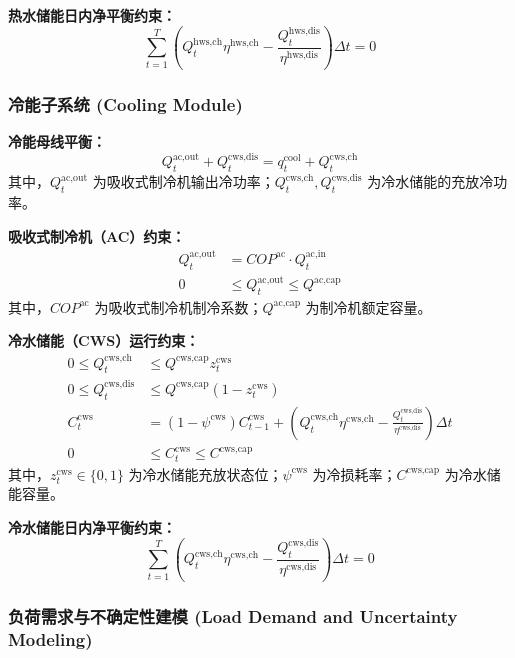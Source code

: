 \documentclass[11pt]{ctexart}
\begin{document}
\textbf{热水储能日内净平衡约束：}
\begin{equation}
\sum_{t=1}^{T} \left( Q_{t}^{\text{hws,ch}} \eta^{\text{hws,ch}} - \frac{Q_{t}^{\text{hws,dis}}}{\eta^{\text{hws,dis}}} \right) \Delta t = 0
\end{equation}

\subsubsection{冷能子系统 (Cooling Module)}

\textbf{冷能母线平衡：}
\begin{equation}
Q_{t}^{\text{ac,out}} + Q_{t}^{\text{cws,dis}} = q_{t}^{\text{cool}} + Q_{t}^{\text{cws,ch}}
\end{equation}
其中，$Q_{t}^{\text{ac,out}}$ 为吸收式制冷机输出冷功率；$Q_{t}^{\text{cws,ch}}, Q_{t}^{\text{cws,dis}}$ 为冷水储能的充放冷功率。

\textbf{吸收式制冷机（AC）约束：}
\begin{align}
Q_{t}^{\text{ac,out}} & = COP^{\text{ac}} \cdot Q_{t}^{\text{ac,in}} \\
0 & \le Q_{t}^{\text{ac,out}} \le Q^{\text{ac,cap}}
\end{align}
其中，$COP^{\text{ac}}$ 为吸收式制冷机制冷系数；$Q^{\text{ac,cap}}$ 为制冷机额定容量。

\textbf{冷水储能（CWS）运行约束：}
\begin{align}
0 \le Q_{t}^{\text{cws,ch}} & \le Q^{\text{cws,cap}} z_{t}^{\text{cws}} \\
0 \le Q_{t}^{\text{cws,dis}} & \le Q^{\text{cws,cap}} (1 - z_{t}^{\text{cws}}) \\
C_{t}^{\text{cws}} & = (1 - \psi^{\text{cws}}) C_{t-1}^{\text{cws}} + \left( Q_{t}^{\text{cws,ch}} \eta^{\text{cws,ch}} - \frac{Q_{t}^{\text{cws,dis}}}{\eta^{\text{cws,dis}}} \right) \Delta t \\
0 & \le C_{t}^{\text{cws}} \le C^{\text{cws,cap}}
\end{align}
其中，$z_{t}^{\text{cws}} \in \{0, 1\}$ 为冷水储能充放状态位；$\psi^{\text{cws}}$ 为冷损耗率；$C^{\text{cws,cap}}$ 为冷水储能容量。

\textbf{冷水储能日内净平衡约束：}
\begin{equation}
\sum_{t=1}^{T} \left( Q_{t}^{\text{cws,ch}} \eta^{\text{cws,ch}} - \frac{Q_{t}^{\text{cws,dis}}}{\eta^{\text{cws,dis}}} \right) \Delta t = 0
\end{equation}

\subsubsection{负荷需求与不确定性建模 (Load Demand and Uncertainty Modeling)}
\end{document}
